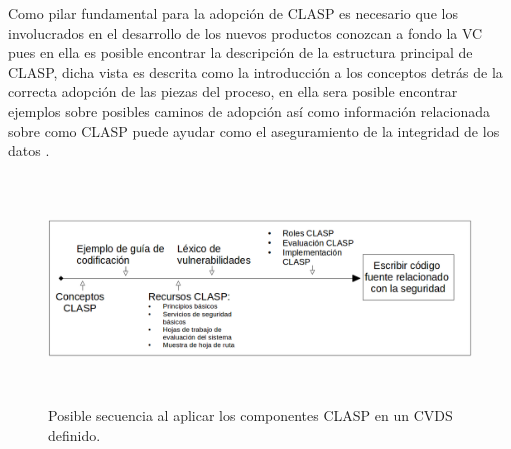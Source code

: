 \documentclass[runningheads,a4paper]{llncs}
\begin{document}
Como pilar fundamental para la adopción de \gls{CLASP} es necesario que los involucrados en el desarrollo de los nuevos productos conozcan a fondo la \gls{VC} pues en ella es posible encontrar la descripción de la estructura principal de \gls{CLASP}, dicha vista es descrita como la introducción a los conceptos detrás de la correcta adopción de las piezas del proceso, en ella sera posible encontrar ejemplos sobre posibles caminos de adopción así como información relacionada sobre como \gls{CLASP} puede ayudar como el aseguramiento de la integridad de los datos \cite{CLASPIntroduction}.\\    

\begin{figure}
\centering
\includegraphics[height=6.0cm, width=12.0cm]{sa_figura_13}
\caption{Posible secuencia al aplicar los componentes \gls{CLASP} en un \gls{CVDS} definido.}
\label{fig:example}
\end{figure}
\end{document}
